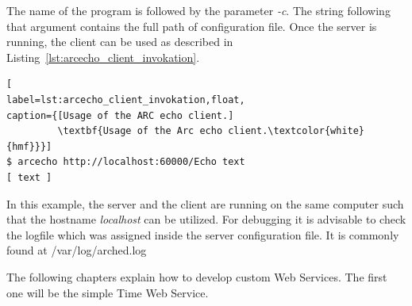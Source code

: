 %
%
The name of the program is followed by the parameter \textit{-c}.
The string following that argument contains the full path of configuration file.
Once the server is running, the client can be used as described in Listing~\ref{lst:arcecho_client_invokation}.
\begin{lstlisting}[
label=lst:arcecho_client_invokation,float,
caption={[Usage of the ARC echo client.]
         \textbf{Usage of the Arc echo client.\textcolor{white}{hmf}}}]
$ arcecho http://localhost:60000/Echo text
[ text ]
\end{lstlisting}

In this example, the server and the client are running on the same computer such that the hostname \textit{localhost} can be utilized. 
For debugging it is advisable to check the logfile which was assigned inside the server configuration file.
It is commonly found at /var/log/arched.log

The following chapters explain how to develop custom Web Services.
The first one will be the simple Time Web Service.












